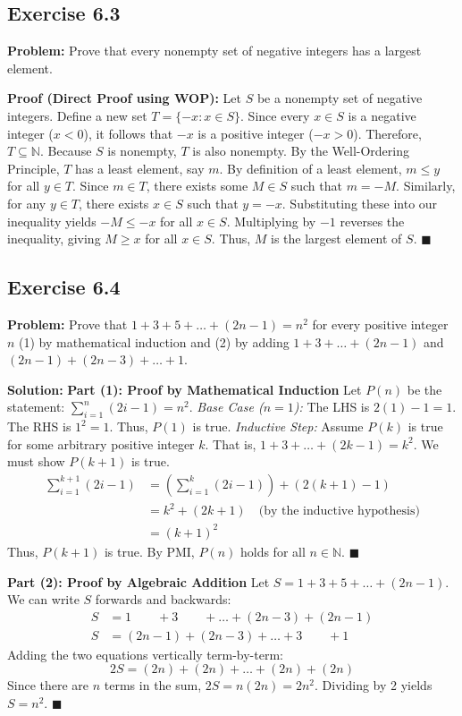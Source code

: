 \documentclass[11pt, a4paper]{article}
\theoremstyle{definition}
\theoremstyle{remark}
\newcommand{\N}{\mathbb{N}}
\begin{document}
\subsection*{Exercise 6.3}
\textbf{Problem:} Prove that every nonempty set of negative integers has a largest element.

\textbf{Proof (Direct Proof using WOP):}
Let $S$ be a nonempty set of negative integers. Define a new set $T = \{-x : x \in S\}$. 
Since every $x \in S$ is a negative integer ($x < 0$), it follows that $-x$ is a positive integer ($-x > 0$). Therefore, $T \subseteq \N$. 
Because $S$ is nonempty, $T$ is also nonempty. By the Well-Ordering Principle, $T$ has a least element, say $m$. 
By definition of a least element, $m \le y$ for all $y \in T$. 
Since $m \in T$, there exists some $M \in S$ such that $m = -M$. Similarly, for any $y \in T$, there exists $x \in S$ such that $y = -x$. 
Substituting these into our inequality yields $-M \le -x$ for all $x \in S$. 
Multiplying by $-1$ reverses the inequality, giving $M \ge x$ for all $x \in S$. 
Thus, $M$ is the largest element of $S$. \hfill $\blacksquare$

\subsection*{Exercise 6.4}
\textbf{Problem:} Prove that $1 + 3 + 5 + \dots + (2n - 1) = n^2$ for every positive integer $n$
(1) by mathematical induction and (2) by adding $1 + 3 + \dots + (2n - 1)$ and $(2n - 1) + (2n - 3) + \dots + 1$.

\textbf{Solution:}
\textbf{Part (1): Proof by Mathematical Induction}
Let $P(n)$ be the statement: $\sum_{i=1}^n (2i - 1) = n^2$.
\textit{Base Case ($n=1$):} The LHS is $2(1) - 1 = 1$. The RHS is $1^2 = 1$. Thus, $P(1)$ is true.
\textit{Inductive Step:} Assume $P(k)$ is true for some arbitrary positive integer $k$. That is, $1 + 3 + \dots + (2k - 1) = k^2$. We must show $P(k+1)$ is true.
\[
\begin{aligned}
\sum_{i=1}^{k+1} (2i - 1) &= \left( \sum_{i=1}^k (2i - 1) \right) + (2(k+1) - 1) \\
&= k^2 + (2k + 1) \quad \text{(by the inductive hypothesis)} \\
&= (k+1)^2
\end{aligned}
\]
Thus, $P(k+1)$ is true. By PMI, $P(n)$ holds for all $n \in \N$. \hfill $\blacksquare$

\textbf{Part (2): Proof by Algebraic Addition}
Let $S = 1 + 3 + 5 + \dots + (2n - 1)$. We can write $S$ forwards and backwards:
\[
\begin{aligned}
S &= 1 \quad\quad + 3 \quad\quad + \dots + (2n - 3) + (2n - 1) \\
S &= (2n - 1) + (2n - 3) + \dots + 3 \quad\quad + 1
\end{aligned}
\]
Adding the two equations vertically term-by-term:
\[
2S = (2n) + (2n) + \dots + (2n) + (2n)
\]
Since there are $n$ terms in the sum, $2S = n(2n) = 2n^2$. Dividing by 2 yields $S = n^2$. \hfill $\blacksquare$
\end{document}
